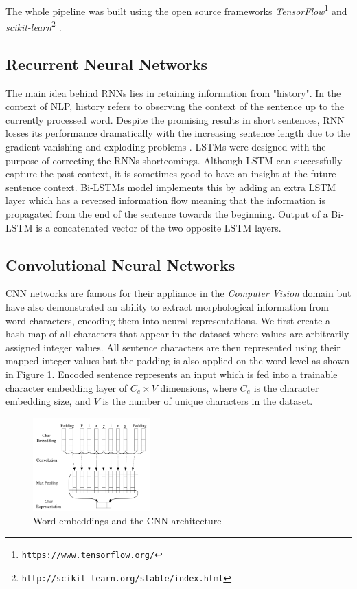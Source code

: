 \documentclass[10pt, a4paper]{article}
\begin{document}
The whole pipeline was built using the open source frameworks
\emph{TensorFlow}\footnote{\texttt{https://www.tensorflow.org/}} \citep{tensorflow2015}
and
\emph{scikit-learn}\footnote{\texttt{http://scikit-learn.org/stable/index.html}} \citep{scikit-learn}.

\subsection{Recurrent Neural Networks}

The main idea behind RNNs lies in retaining information from "history". In the 
context of NLP, history refers to observing the context of the sentence up to the
currently processed word. Despite the promising results in short sentences, RNN
losses its performance dramatically with the increasing sentence length due to 
the gradient vanishing \citep{bengio1994learning} and exploding problems 
\citep{pascanu2013difficulty}. LSTMs were designed with the purpose of correcting 
the RNNs shortcomings. Although LSTM can successfully capture the past context,
it is sometimes good to have an insight at the future sentence context. Bi-LSTMs 
model implements this by adding an extra LSTM layer which has a reversed information flow
meaning that the information is propagated from the end of the sentence towards
the beginning. Output of a Bi-LSTM is a concatenated vector of the two opposite LSTM layers.

\subsection{Convolutional Neural Networks}
CNN networks are famous for their appliance in the \emph{Computer Vision}
domain but have also demonstrated an ability to extract morphological information
from word characters, encoding them into neural representations. We first create
a hash map of all characters that appear in the dataset where values are arbitrarily
assigned integer values. All sentence characters are then represented using their
mapped integer values but the padding is also applied on the word level as shown
in Figure \ref{fig:cnn_embed}. Encoded sentence represents an input which is fed
into a trainable character embedding layer of $C_e \times V$ dimensions, where
$C_e$ is the character embedding size, and $V$ is the number of unique characters in the dataset.

\begin{figure}
  \caption{Word embeddings and the CNN architecture}
  \label{fig:cnn_embed}
  \centering
    \includegraphics[width=0.4\textwidth]{imgs/cnn_embed.png}
\end{figure}
\end{document}
